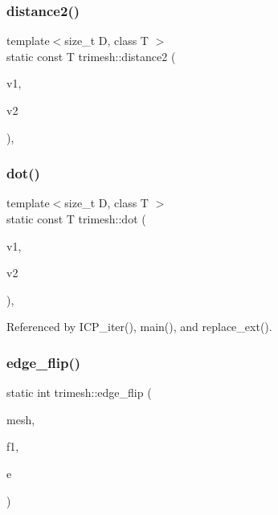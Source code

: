 \mbox{\label{namespacetrimesh_a5de6b8e4e289110f54c69ce88d2304a2}} 
\subsubsection{\texorpdfstring{distance2()}{distance2()}}
{\footnotesize\ttfamily template$<$size\+\_\+t D, class T $>$ \\
static const T trimesh\+::distance2 (\begin{DoxyParamCaption}\item[{const \hyperlink{classtrimesh_1_1Vec}{Vec}$<$ D, T $>$ \&}]{v1,  }\item[{const \hyperlink{classtrimesh_1_1Vec}{Vec}$<$ D, T $>$ \&}]{v2 }\end{DoxyParamCaption})\hspace{0.3cm}{\ttfamily [inline]}, {\ttfamily [static]}}

\mbox{\label{namespacetrimesh_a5d326e02a6fb5bd967f9c502d2bad5cc}} 
\subsubsection{\texorpdfstring{dot()}{dot()}}
{\footnotesize\ttfamily template$<$size\+\_\+t D, class T $>$ \\
static const T trimesh\+::dot (\begin{DoxyParamCaption}\item[{const \hyperlink{classtrimesh_1_1Vec}{Vec}$<$ D, T $>$ \&}]{v1,  }\item[{const \hyperlink{classtrimesh_1_1Vec}{Vec}$<$ D, T $>$ \&}]{v2 }\end{DoxyParamCaption})\hspace{0.3cm}{\ttfamily [inline]}, {\ttfamily [static]}}



Referenced by I\+C\+P\+\_\+iter(), main(), and replace\+\_\+ext().

\mbox{\label{namespacetrimesh_a77fa200471c2aa3e4c840ff365886565}} 
\subsubsection{\texorpdfstring{edge\+\_\+flip()}{edge\_flip()}}
{\footnotesize\ttfamily static int trimesh\+::edge\+\_\+flip (\begin{DoxyParamCaption}\item[{\hyperlink{classtrimesh_1_1TriMesh}{Tri\+Mesh} $\ast$}]{mesh,  }\item[{int}]{f1,  }\item[{int}]{e }\end{DoxyParamCaption})\hspace{0.3cm}{\ttfamily [static]}}



